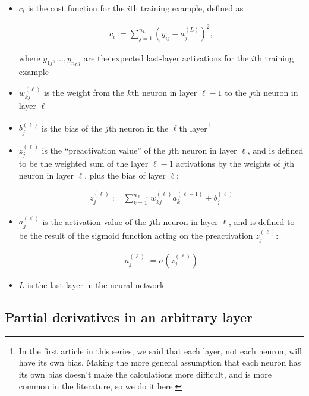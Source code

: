 \documentclass{article}
\begin{document}
	\begin{itemize}
		\item $c_i$ is the cost function for the $i$th training example, defined as
		
		\begin{align*}
			c_i := \sum_{j = 1}^{n_L} (y_{ij} - a^{(L)}_j)^2,
		\end{align*}
		
		where $y_{1j}, ..., y_{n_L j}$ are the expected last-layer activations for the $i$th training example
		
		\item $w^{(\ell)}_{kj}$ is the weight from the $k$th neuron in layer $\ell - 1$ to the $j$th neuron in layer $\ell$
		\item $b^{(\ell)}_j$ is the bias of the $j$th neuron in the $\ell$th layer\footnote{In the first article in this series, we said that each layer, not each neuron, will have its own bias. Making the more general assumption that each neuron has its own bias doesn't make the calculations more difficult, and is more common in the literature, so we do it here.}
		\item $z^{(\ell)}_j$ is the ``preactivation value'' of the $j$th neuron in layer $\ell$, and is defined to be the weighted sum of the layer $\ell - 1$ activations by the weights of $j$th neuron in layer $\ell$, plus the bias of layer $\ell$:
		
		\begin{align*}
			z^{(\ell)}_j := \sum_{k = 1}^{n_{\ell-1}} w^{(\ell)}_{kj} a^{(\ell - 1)}_k + b^{(\ell)}_j
		\end{align*}
		
		\item $a^{(\ell)}_j$ is the activation value of the $j$th neuron in layer $\ell$, and is defined to be the result of the sigmoid function acting on the preactivation $z^{(\ell)}_j$:
		
		\begin{align*}
			a^{(\ell)}_j := \sigma(z^{(\ell)}_j)
		\end{align*}
		
		\item $L$ is the last layer in the neural network
	\end{itemize}
	
	\subsection*{Partial derivatives in an arbitrary layer}
	
\end{document}
